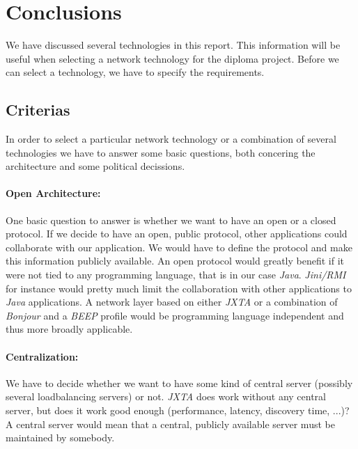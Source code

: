 \section{Conclusions}
We have discussed several technologies in this report. This information will be useful when selecting a network technology for the diploma project. Before we can select a technology, we have to specify the requirements.


\subsection{Criterias}
In order to select a particular network technology or a combination of several technologies we have to answer some basic questions, both concering the architecture and some political decissions.

\paragraph{Open Architecture:} One basic question to answer is whether we want to have an open or a closed protocol. If we decide to have an open, public protocol, other applications could collaborate with our application. We would have to define the protocol and make this information publicly available. An open protocol would greatly benefit if it were not tied to any programming language, that is in our case \emph{Java}. \emph{Jini/RMI} for instance would pretty much limit the collaboration with other applications to \emph{Java} applications. A network layer based on either \emph{JXTA} or a combination of \emph{Bonjour} and a \emph{BEEP} profile would be programming language independent and thus more broadly applicable.

\paragraph{Centralization:} We have to decide whether we want to have some kind of central server (possibly several loadbalancing servers) or not. \emph{JXTA} does work without any central server, but does it work good enough (performance, latency, discovery time, ...)? A central server would mean that a central, publicly available server must be maintained by somebody. 